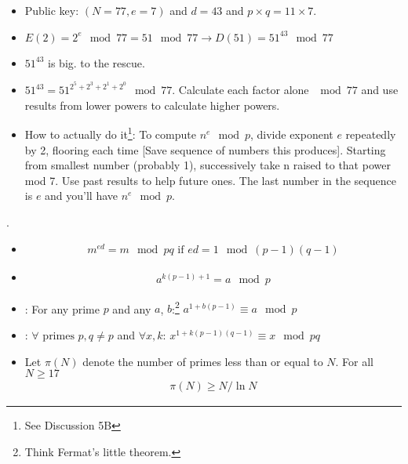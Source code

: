 \documentclass[12pt]{article}
\newcommand\p{\Needspace{12\baselineskip} \noindent}
\begin{document}
\p {}
	\begin{itemize}
		\item Public key: $(N=77, e=7)$ and $d=43$ and $p \times q = 11 \times 7$. 
		
		\item $E(2) = 2^e \mod{77} = 51 \mod{77} \longrightarrow D(51) = 51^{43} \mod{77}$
		
		\item $51^{43}$ is big.  to the rescue. 
		
		\item $51^{43} = 51^{2^5 + 2^3 + 2^1 + 2^0} \mod{77}$. Calculate each factor alone $\mod{77}$ and use results from lower powers to calculate higher powers. 
		
		\item How to actually do it\footnote{See Discussion 5B}: To compute $n^e \mod{p}$, divide exponent $e$ repeatedly by 2, flooring each time [Save sequence of numbers this produces]. Starting from smallest number (probably 1), successively take n raised to that power mod 7. Use past results to help future ones. The last number in the sequence is $e$ and you'll have $n^e \mod{p}$. 
	\end{itemize}

\p {}. 
\begin{itemize}
\item {} 
	\begin{align}
		m^{ed} = m \mod{pq} \text{ if } ed = 1 \mod{(p-1)(q-1)} \label{med}
	\end{align}

\item {} 
\begin{align}
a^{k(p-1) + 1} = a \mod{p}
\end{align}

\item \textbf{}: For any prime $p$ and any $a$, $b$:\footnote{Think Fermat's little theorem.} $a^{1 + b(p-1)} \equiv a \mod{p} $

\item \textbf{}: $\forall \text{ primes } p, q \ne p$ and $\forall x, k$: $x^{1 + k(p-1)(q-1)} \equiv x \mod{pq}$

\item {} Let $\pi(N)$ denote the number of primes less than or equal to $N$. For all $N \ge 17$
\begin{align}
	\pi(N) \ge N/\ln N
\end{align}
\end{itemize}
\end{document}
